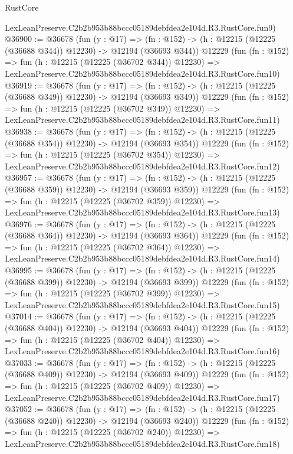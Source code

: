 \begin{lexlean}{RustCore}
\begin{coremodule}
    LexLeanPreserve.C2b2b953b88bccc05189debfdea2e104d.R3.RustCore.fun9)
@36900 := @36678
    (fun (y : @17) =>
    (fn : @152) -> (h : @12215 (@12225 (@36688 @344)) @12230) -> @12194 (@36693 @344))
    @12229
    (fun (fn : @152) =>
    fun (h : @12215 (@12225 (@36702 @344)) @12230) =>
    LexLeanPreserve.C2b2b953b88bccc05189debfdea2e104d.R3.RustCore.fun10)
@36919 := @36678
    (fun (y : @17) =>
    (fn : @152) -> (h : @12215 (@12225 (@36688 @349)) @12230) -> @12194 (@36693 @349))
    @12229
    (fun (fn : @152) =>
    fun (h : @12215 (@12225 (@36702 @349)) @12230) =>
    LexLeanPreserve.C2b2b953b88bccc05189debfdea2e104d.R3.RustCore.fun11)
@36938 := @36678
    (fun (y : @17) =>
    (fn : @152) -> (h : @12215 (@12225 (@36688 @354)) @12230) -> @12194 (@36693 @354))
    @12229
    (fun (fn : @152) =>
    fun (h : @12215 (@12225 (@36702 @354)) @12230) =>
    LexLeanPreserve.C2b2b953b88bccc05189debfdea2e104d.R3.RustCore.fun12)
@36957 := @36678
    (fun (y : @17) =>
    (fn : @152) -> (h : @12215 (@12225 (@36688 @359)) @12230) -> @12194 (@36693 @359))
    @12229
    (fun (fn : @152) =>
    fun (h : @12215 (@12225 (@36702 @359)) @12230) =>
    LexLeanPreserve.C2b2b953b88bccc05189debfdea2e104d.R3.RustCore.fun13)
@36976 := @36678
    (fun (y : @17) =>
    (fn : @152) -> (h : @12215 (@12225 (@36688 @364)) @12230) -> @12194 (@36693 @364))
    @12229
    (fun (fn : @152) =>
    fun (h : @12215 (@12225 (@36702 @364)) @12230) =>
    LexLeanPreserve.C2b2b953b88bccc05189debfdea2e104d.R3.RustCore.fun14)
@36995 := @36678
    (fun (y : @17) =>
    (fn : @152) -> (h : @12215 (@12225 (@36688 @399)) @12230) -> @12194 (@36693 @399))
    @12229
    (fun (fn : @152) =>
    fun (h : @12215 (@12225 (@36702 @399)) @12230) =>
    LexLeanPreserve.C2b2b953b88bccc05189debfdea2e104d.R3.RustCore.fun15)
@37014 := @36678
    (fun (y : @17) =>
    (fn : @152) -> (h : @12215 (@12225 (@36688 @404)) @12230) -> @12194 (@36693 @404))
    @12229
    (fun (fn : @152) =>
    fun (h : @12215 (@12225 (@36702 @404)) @12230) =>
    LexLeanPreserve.C2b2b953b88bccc05189debfdea2e104d.R3.RustCore.fun16)
@37033 := @36678
    (fun (y : @17) =>
    (fn : @152) -> (h : @12215 (@12225 (@36688 @409)) @12230) -> @12194 (@36693 @409))
    @12229
    (fun (fn : @152) =>
    fun (h : @12215 (@12225 (@36702 @409)) @12230) =>
    LexLeanPreserve.C2b2b953b88bccc05189debfdea2e104d.R3.RustCore.fun17)
@37052 := @36678
    (fun (y : @17) =>
    (fn : @152) -> (h : @12215 (@12225 (@36688 @240)) @12230) -> @12194 (@36693 @240))
    @12229
    (fun (fn : @152) =>
    fun (h : @12215 (@12225 (@36702 @240)) @12230) =>
    LexLeanPreserve.C2b2b953b88bccc05189debfdea2e104d.R3.RustCore.fun18)

\end{coremodule}
\end{lexlean}
